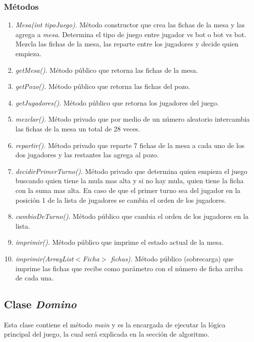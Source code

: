 \documentclass[12pt]{article}
\begin{document}
  \subsubsection{Métodos}
  \begin{enumerate}
    \item \textit{Mesa(int tipoJuego).} Método constructor que crea las fichas de la mesa y las agrega a \textit{mesa}. Determina el tipo de juego entre jugador vs bot o bot vs bot. Mezcla las fichas de la mesa, las reparte entre los jugadores y decide quien empieza.
    \item \textit{getMesa().} Método público que retorna las fichas de la mesa.
    \item \textit{getPozo().} Método público que retorna las fichas del pozo.
    \item \textit{getJugadores().} Método público que retorna los jugadores del juego.
    \item \textit{mezclar().} Método privado que por medio de un número aleatorio intercambia las fichas de la mesa un total de 28 veces. 
    \item \textit{repartir().} Método privado que reparte 7 fichas de la mesa a cada uno de los dos jugadores y las restantes las agrega al pozo.
    \item \textit{decidirPrimerTurno().} Método privado que determina quien empieza el juego buscando quien tiene la mula mas alta y si no hay mula, quien tiene la ficha con la suma mas alta. En caso de que el primer turno sea del jugador en la posición 1 de la lista de jugadores se cambia el orden de los jugadores.
    \item \textit{cambioDeTurno().} Método público que cambia el orden de los jugadores en la lista.
    \item \textit{imprimir().} Método público que imprime el estado actual de la mesa.
    \item \textit{imprimir(ArrayList$<$Ficha$>$ fichas).} Método público (sobrecarga) que imprime las fichas que recibe como parámetro con el número de ficha arriba de cada una.
  \end{enumerate}

  \subsection{Clase \textit{Domino}}
  Esta clase contiene el método \textit{main} y es la encargada de ejecutar la lógica principal del juego, la cual será explicada en la sección de algoritmo.
  
\end{document}
